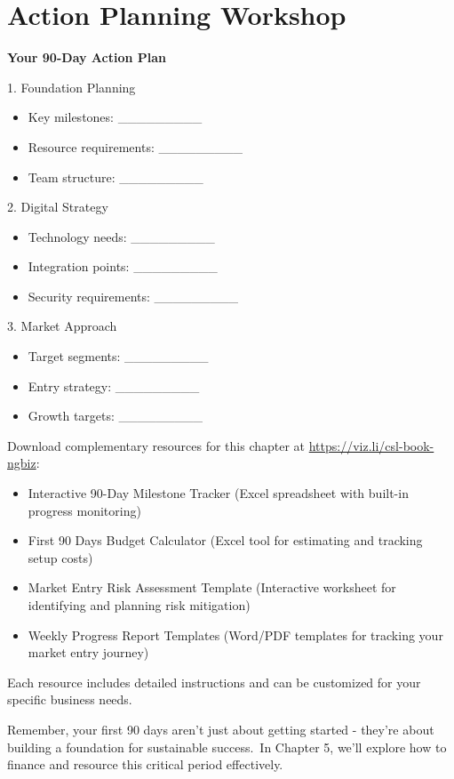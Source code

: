 \section{Action Planning Workshop}\label{sec:action-planning-workshop}

\begin{workshopbox}
\textbf{Your 90-Day Action Plan}

1. Foundation Planning
\begin{itemize}
    \item Key milestones: \_\_\_\_\_\_\_\_\_
    \item Resource requirements: \_\_\_\_\_\_\_\_\_
    \item Team structure: \_\_\_\_\_\_\_\_\_
\end{itemize}

2. Digital Strategy
\begin{itemize}
    \item Technology needs: \_\_\_\_\_\_\_\_\_
    \item Integration points: \_\_\_\_\_\_\_\_\_
    \item Security requirements: \_\_\_\_\_\_\_\_\_
\end{itemize}

3. Market Approach
\begin{itemize}
    \item Target segments: \_\_\_\_\_\_\_\_\_
    \item Entry strategy: \_\_\_\_\_\_\_\_\_
    \item Growth targets: \_\_\_\_\_\_\_\_\_
\end{itemize}
\end{workshopbox}

\begin{communitybox}
    Download complementary resources for this chapter at \href{https://viz.li/csl-book-ngbiz}{https://viz.li/csl-book-ngbiz}:
\begin{itemize}
    \item Interactive 90-Day Milestone Tracker (Excel spreadsheet with built-in progress monitoring)
    \item First 90 Days Budget Calculator (Excel tool for estimating and tracking setup costs)
    \item Market Entry Risk Assessment Template (Interactive worksheet for identifying and planning risk mitigation)
    \item Weekly Progress Report Templates (Word/PDF templates for tracking your market entry journey)
\end{itemize}

Each resource includes detailed instructions and can be customized for your specific business needs.
\end{communitybox}

\begin{importantbox}
Remember, your first 90 days aren't just about getting started - they're about building a foundation for sustainable success.\ In Chapter 5, we'll explore how to finance and resource this critical period effectively.
\end{importantbox}
